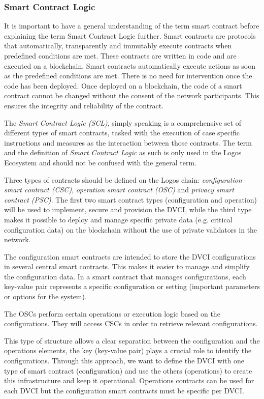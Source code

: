 \documentclass[]{article}
\begin{document}
\subsubsection{Smart Contract Logic}
It is important to have a general understanding of the term smart contract \cite{SubstrateDoc-sc} before explaining the term Smart Contract Logic further.
Smart contracts are protocols that automatically, transparently and immutably execute contracts when predefined conditions are met. 
These contracts are written in code and are executed on a blockchain.
Smart contracts automatically execute actions as soon as the predefined conditions are met. 
There is no need for intervention once the code has been deployed.
Once deployed on a blockchain, the code of a smart contract cannot be changed without the consent of the network participants. 
This ensures the integrity and reliability of the contract.

The \textit{Smart Contract Logic (SCL)}, simply speaking is a comprehensive set of different types of smart contracts, tasked with the execution of case specific instructions and measures as the interaction between those contracts.
The term and the definition of \textit{Smart Contract Logic} as such is only used in the Logos Ecosystem and should not be confused with the general term.

Three types of contracts should be defined on the Logos chain:
\textit{configuration smart contract (CSC)}, \textit{operation smart contract (OSC)} and \textit{privacy smart contract (PSC)}. 
The first two smart contract types (configuration and operation) will be used to implement, secure and provision the DVCI, while the third type makes it possible to deploy and manage specific private data (e.g. critical configuration data) on the blockchain without the use of private validators in the network.  

The configuration smart contracts are intended to store the DVCI configurations in several central smart contracts. 
This makes it easier to manage and simplify the configuration data.
In a smart contract that manages configurations, each key-value pair represents a specific configuration or setting (important parameters or options for the system).

The OSCs perform certain operations or execution logic based on the configurations.
They will access CSCs in order to retrieve relevant configurations.

This type of structure allows a clear separation between the configuration and the operations elements, the key (key-value pair) plays a crucial role to identify the configurations.
Through this approach, we want to define the DVCI with one type of smart contract (configuration) and use the others (operations) to create this infrastructure and keep it operational.
Operations contracts can be used for each DVCI but the configuration smart contracts must be specific per DVCI.
\end{document}
